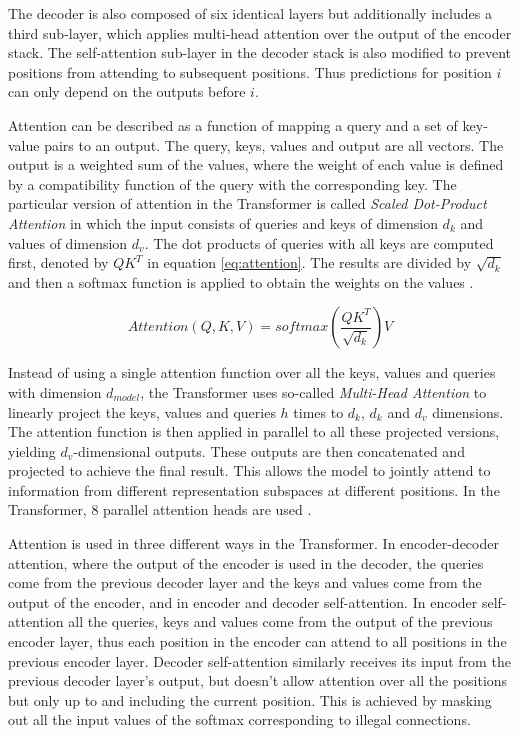 The decoder is also composed of six identical layers but additionally includes a third sub-layer, which applies multi-head attention over the output of the encoder stack.
The self-attention sub-layer in the decoder stack is also modified to prevent positions from attending to subsequent positions.
Thus predictions for position $i$ can only depend on the outputs before $i$.

Attention can be described as a function of mapping a query and a set of key-value pairs to an output.
The query, keys, values and output are all vectors.
The output is a weighted sum of the values, where the weight of each value is defined by a compatibility function of the query with the corresponding key.
The particular version of attention in the Transformer is called \textit{Scaled Dot-Product Attention} in which the input consists of queries and keys of dimension $d_k$ and values of dimension $d_v$.
The dot products of queries with all keys are computed first, denoted by $QK^T$ in equation \ref{eq:attention}.
The results are divided by $\sqrt{d_k}$ and then a softmax function is applied to obtain the weights on the values \cite{vaswani2017}.


\begin{equation}
  Attention(Q,K,V)=softmax(\dfrac{{QK^T}}{{\sqrt{d_k}}})V\label{eq:attention}
\end{equation}

Instead of using a single attention function over all the keys, values and queries with dimension $d_{model}$, the Transformer uses so-called \textit{Multi-Head Attention} to linearly project the keys, values and queries $h$ times to $d_k$, $d_k$ and $d_v$ dimensions.
The attention function is then applied in parallel to all these projected versions, yielding $d_v$-dimensional outputs.
These outputs are then concatenated and projected to achieve the final result.
This allows the model to jointly attend to information from different representation subspaces at different positions.
In the Transformer, 8 parallel attention heads are used \cite{vaswani2017}.

Attention is used in three different ways in the Transformer.
In encoder-decoder attention, where the output of the encoder is used in the decoder, the queries come from the previous decoder layer and the keys and values come from the output of the encoder, and in encoder and decoder self-attention.
In encoder self-attention all the queries, keys and values come from the output of the previous encoder layer, thus each position in the encoder can attend to all positions in the previous encoder layer.
Decoder self-attention similarly receives its input from the previous decoder layer's output, but doesn't allow attention over all the positions but only up to and including the current position.
This is achieved by masking out all the input values of the softmax corresponding to illegal connections.

